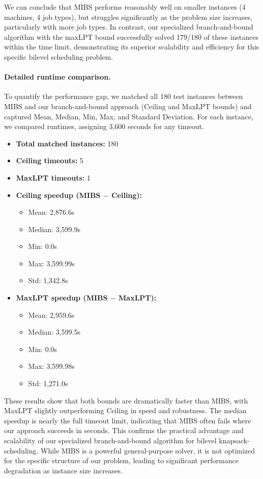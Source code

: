 We can conclude that MIBS performs reasonably well on smaller instances (4 machines, 4 job types), 
but struggles significantly as the problem size increases, particularly with more job types. 
In contrast, our specialized branch-and-bound algorithm with the maxLPT bound
successfully solved 179/180 of these instances within the time limit, demonstrating its superior scalability and efficiency for this specific bilevel scheduling problem.

\paragraph{Detailed runtime comparison.}
To quantify the performance gap, we matched all 180 test instances between MIBS and our branch-and-bound approach (Ceiling and MaxLPT bounds) and captured Mean, Median, Min, Max, and Standard Deviation. For each instance, we compared runtimes, assigning 3,600 seconds for any timeout.

\begin{itemize}
    \item \textbf{Total matched instances:} 180
    \item \textbf{Ceiling timeouts:} 5
    \item \textbf{MaxLPT timeouts:} 1
    \item \textbf{Ceiling speedup (MIBS $-$ Ceiling):}
        \begin{itemize}
            \item Mean: 2,876.6s
            \item Median: 3,599.9s
            \item Min: 0.0s
            \item Max: 3,599.99s
            \item Std: 1,342.8s
        \end{itemize}
    \item \textbf{MaxLPT speedup (MIBS $-$ MaxLPT):}
        \begin{itemize}
            \item Mean: 2,959.6s
            \item Median: 3,599.5s
            \item Min: 0.0s
            \item Max: 3,599.98s
            \item Std: 1,271.0s
        \end{itemize}
\end{itemize}

These results show that both bounds are dramatically faster than MIBS, with MaxLPT slightly outperforming Ceiling in speed and robustness. 
The median speedup is nearly the full timeout limit, indicating that MIBS often fails where our approach succeeds in seconds. 
This confirms the practical advantage and scalability of our specialized branch-and-bound algorithm for bilevel knapsack-scheduling.
While MIBS is a powerful general-purpose solver, it is not optimized for the specific structure of our problem, leading to significant performance degradation as instance size increases.



